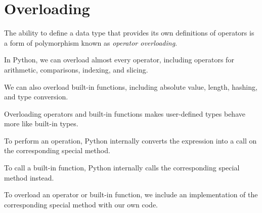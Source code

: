 \documentclass[8pt,a4paper,compress,handout]{beamer}
\begin{document}
\section{Overloading}
\begin{frame}[fragile]
The ability to define a data type that provides its own definitions of operators is a form of polymorphism known as \emph{operator overloading}. 

\bigskip

In Python, we can overload almost every operator, including operators for arithmetic, comparisons, indexing, and slicing.

\bigskip

We can also overload built-in functions, including absolute value, length, hashing, and type conversion. 

\bigskip

Overloading operators and built-in functions makes user-defined types behave more like built-in types.

\bigskip

To perform an operation, Python internally converts the expression into a call on the corresponding special method.

\bigskip

To call a built-in function, Python internally calls the corresponding special method instead. 

\bigskip

To overload an operator or built-in function, we include an implementation of the corresponding special method with our own code.
\end{frame}
\end{document}
